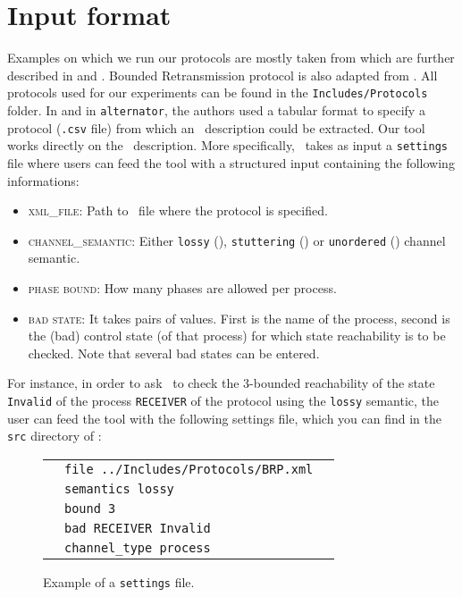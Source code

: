 \section{Input format}
\label{sec:input}

Examples on which we run our protocols are mostly taken from \cite{JRSVgit} 
which are further described in \cite{MPSV11} and \cite{RSV11}.
Bounded Retransmission protocol is also adapted from \cite{AABJ04}.
All protocols used for our experiments can be found in the \texttt{Includes/Protocols} folder.
%
In \cite{JRSVgit} and in \texttt{alternator}, the authors used a tabular format to specify a protocol (\texttt{.csv} file)
from which an \xml\ description could be extracted.
Our tool works directly on the \xml\ description.
%
More specifically, \MPass\ takes as input a \texttt{settings} file where users can feed the tool with a structured input containing the following informations:

\begin{itemize}
\item \textsc{xml\_file}: Path to \xml\ file where the protocol is specified.
\item \textsc{channel\_semantic}: Either \texttt{lossy} (\Lcs), \texttt{stuttering} (\Slcs) or \texttt{unordered} (\Ucs) channel semantic.
\item \textsc{phase bound}: How many phases are allowed per process.
\item \textsc{bad state}: It takes pairs of values.
%
First is the name of the process,  second is the (bad) control state (of that process) for which state reachability is to be checked.
%
Note that several bad states can be entered.
\end{itemize}

For instance, in order to ask \MPass\ to check the $3$-bounded reachability
of the state \texttt{Invalid} of the process \texttt{RECEIVER} of the \Brp protocol
using the \texttt{lossy} semantic,
the user can feed the tool with the following settings file, which you can find in the \texttt{src} directory of \MPass:

\begin{figure}[h]
\begin{center}
\begin{tabular}{ c l c}
&\texttt{file ../Includes/Protocols/BRP.xml}&\\
&\texttt{semantics lossy}&\\
&\texttt{bound 3}&\\
&\texttt{bad RECEIVER Invalid}&\\
&\texttt{channel\_type process}&\\
\end{tabular}
\end{center}
\caption{Example of a \texttt{settings} file.}
\label{fig:settings:file}
\end{figure}

